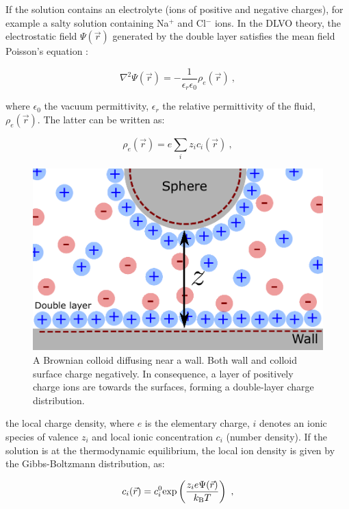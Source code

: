 If the solution contains an electrolyte (ions of positive and negative charges), for example a salty solution containing Na$^+$ and Cl$^-$ ions. In the DLVO theory, the electrostatic field $\Psi(\vec{r})$ generated by the double layer satisfies the mean field Poisson's equation \cite{israelachvili_intermolecular_2015}:

\begin{equation}
	\nabla ^2 \Psi(\vec{r}) = -\frac{1}{\epsilon_r \epsilon_0}  \rho_e(\vec{r})~,
	\label{Eq:poisson}
\end{equation}

where $\epsilon_0$ the vacuum permittivity, $\epsilon_r$ the relative permittivity of the fluid, $\rho_e(\vec{r})$. The latter can be written as:

\begin{equation}
	\rho_e(\vec{r}) = e \sum _i z_i c_i (\vec{r}) ~,
	\label{Eq.3}
\end{equation}

\begin{figure}
\includegraphics{02_body/chapter3/images/double_layer.pdf}
\caption{A Brownian colloid diffusing near a wall. Both wall and colloid surface charge negatively. In consequence, a layer of positively charge ions are towards the surfaces, forming a double-layer charge distribution.}
\label{Fig:double_layer}
\end{figure}


 the local charge density, where $e$ is the elementary charge, $i$ denotes an ionic species of valence $z_i$ and local ionic concentration $c_i$ (number density). If the solution is at the thermodynamic equilibrium, the local ion density is given by the Gibbs-Boltzmann distribution, as:

\begin{equation}
	c_i(\vec{r}) = c_i ^0 \textnormal{exp}\left(\frac{z_i e \Psi(\vec{r})}{k_\mathrm{B} T }\right) ~,
	\label{Eq.4}
\end{equation}


